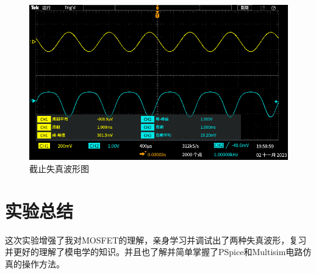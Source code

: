 \documentclass[a4paper]{article}
\theoremstyle{definition}
\theoremstyle{plain}
\theoremstyle{remark}
\begin{document}
\begin{figure}[H]
	\centering
	\includegraphics[width=1\textwidth]{截止失真波形图}
	\caption{截止失真波形图}
	\label{截止失真波形图}
\end{figure}

\clearpage
\section{实验总结}

这次实验增强了我对MOSFET的理解，亲身学习并调试出了两种失真波形，复习并更好的理解了模电学的知识。并且也了解并简单掌握了PSpice和Multisim电路仿真的操作方法。
\end{document}
